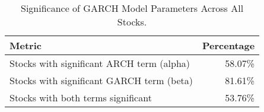 \begin{table}
\caption{Significance of GARCH Model Parameters Across All Stocks.}
\label{tab:garch_summary}
\begin{tabular}{lr}
\toprule
Metric & Percentage \\
\midrule
Stocks with significant ARCH term (alpha) & 58.07\% \\
Stocks with significant GARCH term (beta) & 81.61\% \\
Stocks with both terms significant & 53.76\% \\
\bottomrule
\end{tabular}
\end{table}
